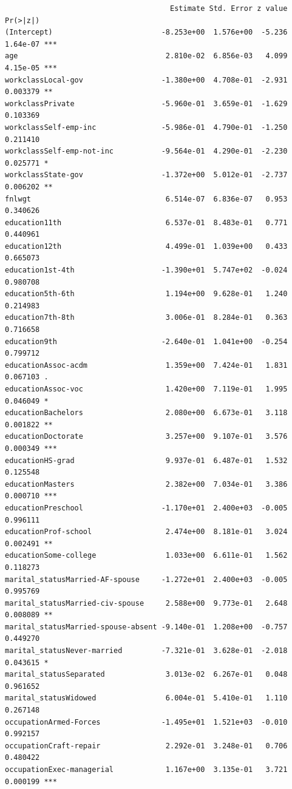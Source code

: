 \documentclass[12pt]{article}
\begin{document}
\footnotesize
\begin{verbatim}
                                      Estimate Std. Error z value Pr(>|z|)    
(Intercept)                         -8.253e+00  1.576e+00  -5.236 1.64e-07 ***
age                                  2.810e-02  6.856e-03   4.099 4.15e-05 ***
workclassLocal-gov                  -1.380e+00  4.708e-01  -2.931 0.003379 ** 
workclassPrivate                    -5.960e-01  3.659e-01  -1.629 0.103369    
workclassSelf-emp-inc               -5.986e-01  4.790e-01  -1.250 0.211410    
workclassSelf-emp-not-inc           -9.564e-01  4.290e-01  -2.230 0.025771 *  
workclassState-gov                  -1.372e+00  5.012e-01  -2.737 0.006202 ** 
fnlwgt                               6.514e-07  6.836e-07   0.953 0.340626    
education11th                        6.537e-01  8.483e-01   0.771 0.440961    
education12th                        4.499e-01  1.039e+00   0.433 0.665073    
education1st-4th                    -1.390e+01  5.747e+02  -0.024 0.980708    
education5th-6th                     1.194e+00  9.628e-01   1.240 0.214983    
education7th-8th                     3.006e-01  8.284e-01   0.363 0.716658    
education9th                        -2.640e-01  1.041e+00  -0.254 0.799712    
educationAssoc-acdm                  1.359e+00  7.424e-01   1.831 0.067103 .  
educationAssoc-voc                   1.420e+00  7.119e-01   1.995 0.046049 *  
educationBachelors                   2.080e+00  6.673e-01   3.118 0.001822 ** 
educationDoctorate                   3.257e+00  9.107e-01   3.576 0.000349 ***
educationHS-grad                     9.937e-01  6.487e-01   1.532 0.125548    
educationMasters                     2.382e+00  7.034e-01   3.386 0.000710 ***
educationPreschool                  -1.170e+01  2.400e+03  -0.005 0.996111    
educationProf-school                 2.474e+00  8.181e-01   3.024 0.002491 ** 
educationSome-college                1.033e+00  6.611e-01   1.562 0.118273    
marital_statusMarried-AF-spouse     -1.272e+01  2.400e+03  -0.005 0.995769    
marital_statusMarried-civ-spouse     2.588e+00  9.773e-01   2.648 0.008089 ** 
marital_statusMarried-spouse-absent -9.140e-01  1.208e+00  -0.757 0.449270    
marital_statusNever-married         -7.321e-01  3.628e-01  -2.018 0.043615 *  
marital_statusSeparated              3.013e-02  6.267e-01   0.048 0.961652    
marital_statusWidowed                6.004e-01  5.410e-01   1.110 0.267148    
occupationArmed-Forces              -1.495e+01  1.521e+03  -0.010 0.992157    
occupationCraft-repair               2.292e-01  3.248e-01   0.706 0.480422    
occupationExec-managerial            1.167e+00  3.135e-01   3.721 0.000199 ***

\end{verbatim}
\end{document}
